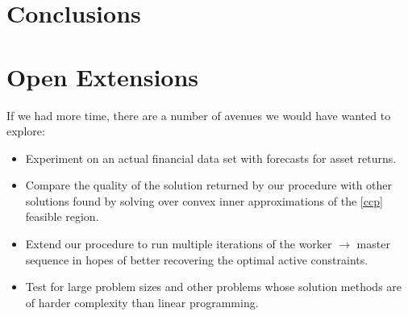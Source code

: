 \documentclass[12pt]{article}
\begin{document}
\section*{Conclusions}

\section*{Open Extensions}
If we had more time, there are a number of avenues we would have wanted to explore:
\begin{itemize}
\item Experiment on an actual financial data set with forecasts for asset returns.
\item Compare the quality of the solution returned by our procedure with other solutions found by solving over convex inner approximations of the \ref{ccp} feasible region.
\item Extend our procedure to run multiple iterations of the worker $\to$ master sequence in hopes of better recovering the optimal active constraints.
\item Test for large problem sizes and other problems whose solution methods are of harder complexity than linear programming.
\end{itemize}

%
%


 
\end{document}
